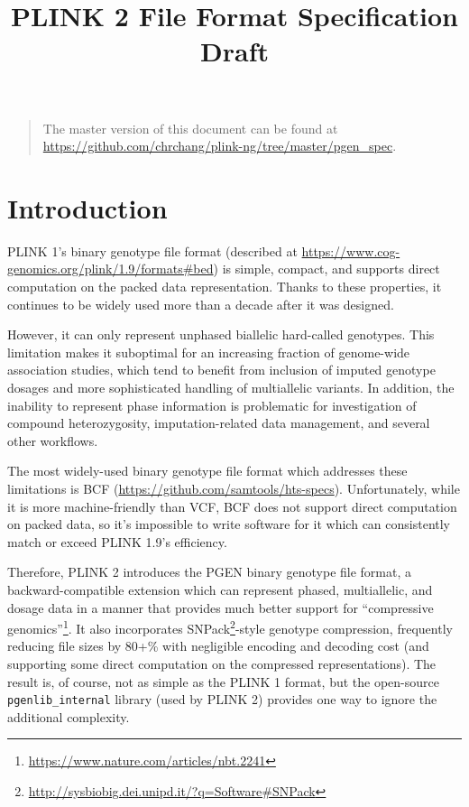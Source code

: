 \documentclass[8pt]{article}
\begin{document}
\title{PLINK 2 File Format Specification Draft}
\maketitle
\begin{quote}\small
  The master version of this document can be found at
  \url{https://github.com/chrchang/plink-ng/tree/master/pgen_spec}. \\
\end{quote}

\newpage
\tableofcontents

\newpage
\section{Introduction}
PLINK 1's binary genotype file format (described at
\url{https://www.cog-genomics.org/plink/1.9/formats#bed}) is simple, compact,
and supports direct computation on the packed data representation.  Thanks to
these properties, it continues to be widely used more than a decade after it
was designed.

However, it can only represent unphased biallelic hard-called genotypes.  This
limitation makes it suboptimal for an increasing fraction of genome-wide
association studies, which tend to benefit from inclusion of imputed genotype
dosages and more sophisticated handling of multiallelic variants.  In addition,
the inability to represent phase information is problematic for investigation
of compound heterozygosity, imputation-related data management, and several
other workflows.

The most widely-used binary genotype file format which addresses these
limitations is BCF (\url{https://github.com/samtools/hts-specs}).
Unfortunately, while it is more machine-friendly than VCF, BCF does not support
direct computation on packed data, so it's impossible to write software for it
which can consistently match or exceed PLINK 1.9's efficiency.

Therefore, PLINK 2 introduces the PGEN binary genotype file format, a
backward-compatible extension which can represent phased, multiallelic, and
dosage data in a manner that provides much better support for ``compressive
genomics''\footnote{\url{https://www.nature.com/articles/nbt.2241}}.  It also
incorporates
SNPack\footnote{\url{http://sysbiobig.dei.unipd.it/?q=Software\#SNPack}}-style
genotype compression, frequently reducing file sizes by 80+\% with negligible
encoding and decoding cost (and supporting some direct computation on the
compressed representations).  The result is, of course, not as simple as the
PLINK 1 format, but the open-source \texttt{pgenlib\_internal} library (used by
PLINK 2) provides one way to ignore the additional complexity.
\end{document}
